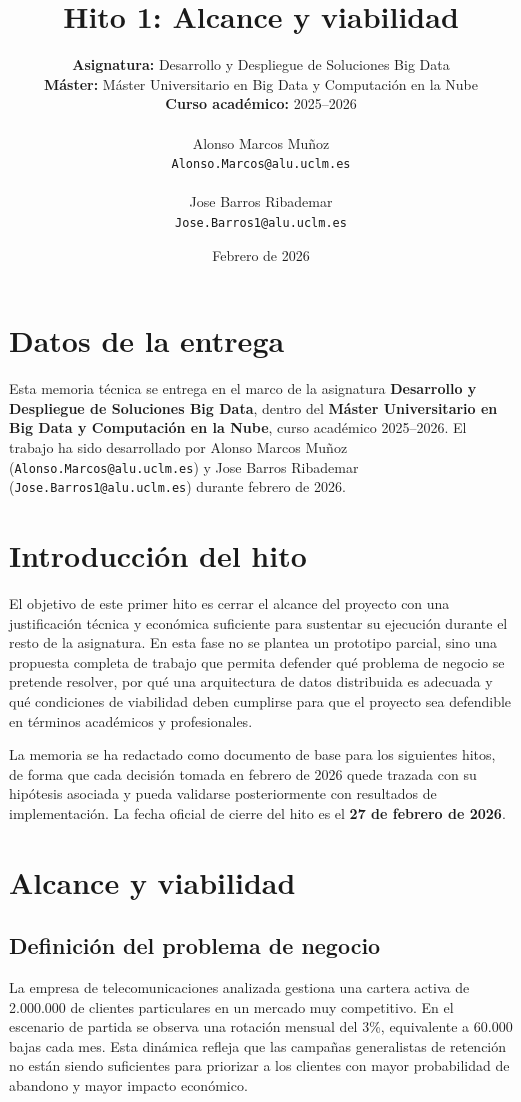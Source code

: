 ﻿\documentclass[12pt,a4paper]{article}
\title{\textbf{Hito 1: Alcance y viabilidad}}
\author{
\textbf{Asignatura:} Desarrollo y Despliegue de Soluciones Big Data \\
\textbf{Máster:} Máster Universitario en Big Data y Computación en la Nube \\
\textbf{Curso académico:} 2025--2026 \\
\\
Alonso Marcos Muñoz \\
\texttt{Alonso.Marcos@alu.uclm.es} \\
\\
Jose Barros Ribademar \\
\texttt{Jose.Barros1@alu.uclm.es}
}
\date{Febrero de 2026}
\begin{document}
\maketitle
\tableofcontents
\newpage

\section*{Datos de la entrega}

Esta memoria técnica se entrega en el marco de la asignatura \textbf{Desarrollo y Despliegue de Soluciones Big Data}, dentro del \textbf{Máster Universitario en Big Data y Computación en la Nube}, curso académico 2025--2026. El trabajo ha sido desarrollado por Alonso Marcos Muñoz (\texttt{Alonso.Marcos@alu.uclm.es}) y Jose Barros Ribademar (\texttt{Jose.Barros1@alu.uclm.es}) durante febrero de 2026.

\section{Introducción del hito}

El objetivo de este primer hito es cerrar el alcance del proyecto con una justificación técnica y económica suficiente para sustentar su ejecución durante el resto de la asignatura. En esta fase no se plantea un prototipo parcial, sino una propuesta completa de trabajo que permita defender qué problema de negocio se pretende resolver, por qué una arquitectura de datos distribuida es adecuada y qué condiciones de viabilidad deben cumplirse para que el proyecto sea defendible en términos académicos y profesionales.

La memoria se ha redactado como documento de base para los siguientes hitos, de forma que cada decisión tomada en febrero de 2026 quede trazada con su hipótesis asociada y pueda validarse posteriormente con resultados de implementación. La fecha oficial de cierre del hito es el \textbf{27 de febrero de 2026}.

\section{Alcance y viabilidad}

\subsection{Definición del problema de negocio}

La empresa de telecomunicaciones analizada gestiona una cartera activa de 2.000.000 de clientes particulares en un mercado muy competitivo. En el escenario de partida se observa una rotación mensual del 3\%, equivalente a 60.000 bajas cada mes. Esta dinámica refleja que las campañas generalistas de retención no están siendo suficientes para priorizar a los clientes con mayor probabilidad de abandono y mayor impacto económico.
\end{document}
